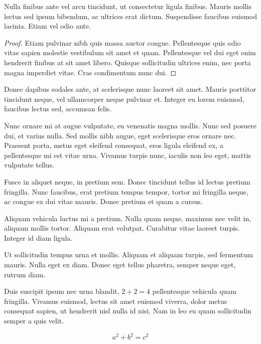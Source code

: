 \begin{theorem}
Nulla finibus ante vel arcu tincidunt, ut consectetur ligula finibus. Mauris mollis lectus sed ipsum bibendum, ac ultrices erat dictum. Suspendisse faucibus euismod lacinia. Etiam vel odio ante.
\end{theorem}
\begin{proof}
Etiam pulvinar nibh quis massa auctor congue. Pellentesque quis odio vitae sapien molestie vestibulum sit amet et quam. Pellentesque vel dui eget enim hendrerit finibus at sit amet libero. Quisque sollicitudin ultrices enim, nec porta magna imperdiet vitae. Cras condimentum nunc dui.
\end{proof}

Donec dapibus sodales ante, at scelerisque nunc laoreet sit amet. Mauris porttitor tincidunt neque, vel ullamcorper neque pulvinar et. Integer eu lorem euismod, faucibus lectus sed, accumsan felis. 

\begin{remark}
Nunc ornare mi at augue vulputate, eu venenatis magna mollis. Nunc sed posuere dui, et varius nulla. Sed mollis nibh augue, eget scelerisque eros ornare nec. Praesent porta, metus eget eleifend consequat, eros ligula eleifend ex, a pellentesque mi est vitae urna. Vivamus turpis nunc, iaculis non leo eget, mattis vulputate tellus.
\end{remark}

Fusce in aliquet neque, in pretium sem. Donec tincidunt tellus id lectus pretium fringilla. Nunc faucibus, erat pretium tempus tempor, tortor mi fringilla neque, ac congue ex dui vitae mauris. Donec pretium et quam a cursus.

\begin{note}
Aliquam vehicula luctus mi a pretium. Nulla quam neque, maximus nec velit in, aliquam mollis tortor. Aliquam erat volutpat. Curabitur vitae laoreet turpis. Integer id diam ligula.
\end{note}

Ut sollicitudin tempus urna et mollis. Aliquam et aliquam turpis, sed fermentum mauris. Nulla eget ex diam. Donec eget tellus pharetra, semper neque eget, rutrum diam.


Duis suscipit ipsum nec urna blandit, $2 + 2 = 4$ pellentesque vehicula quam fringilla. Vivamus euismod, lectus sit amet euismod viverra, dolor metus consequat sapien, ut hendrerit nisl nulla id nisi. Nam in leo eu quam sollicitudin semper a quis velit.

$$a^2 + b^2 = c^2$$

